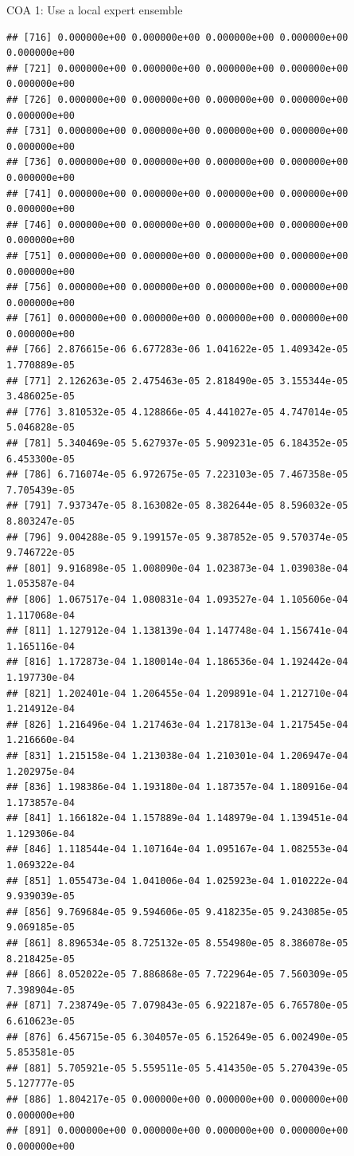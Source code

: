 \documentclass[ignorenonframetext,]{beamer}
\begin{document}
\begin{frame}[fragile]{COA 1: Use a local expert ensemble}
\begin{verbatim}
## [716] 0.000000e+00 0.000000e+00 0.000000e+00 0.000000e+00 0.000000e+00
## [721] 0.000000e+00 0.000000e+00 0.000000e+00 0.000000e+00 0.000000e+00
## [726] 0.000000e+00 0.000000e+00 0.000000e+00 0.000000e+00 0.000000e+00
## [731] 0.000000e+00 0.000000e+00 0.000000e+00 0.000000e+00 0.000000e+00
## [736] 0.000000e+00 0.000000e+00 0.000000e+00 0.000000e+00 0.000000e+00
## [741] 0.000000e+00 0.000000e+00 0.000000e+00 0.000000e+00 0.000000e+00
## [746] 0.000000e+00 0.000000e+00 0.000000e+00 0.000000e+00 0.000000e+00
## [751] 0.000000e+00 0.000000e+00 0.000000e+00 0.000000e+00 0.000000e+00
## [756] 0.000000e+00 0.000000e+00 0.000000e+00 0.000000e+00 0.000000e+00
## [761] 0.000000e+00 0.000000e+00 0.000000e+00 0.000000e+00 0.000000e+00
## [766] 2.876615e-06 6.677283e-06 1.041622e-05 1.409342e-05 1.770889e-05
## [771] 2.126263e-05 2.475463e-05 2.818490e-05 3.155344e-05 3.486025e-05
## [776] 3.810532e-05 4.128866e-05 4.441027e-05 4.747014e-05 5.046828e-05
## [781] 5.340469e-05 5.627937e-05 5.909231e-05 6.184352e-05 6.453300e-05
## [786] 6.716074e-05 6.972675e-05 7.223103e-05 7.467358e-05 7.705439e-05
## [791] 7.937347e-05 8.163082e-05 8.382644e-05 8.596032e-05 8.803247e-05
## [796] 9.004288e-05 9.199157e-05 9.387852e-05 9.570374e-05 9.746722e-05
## [801] 9.916898e-05 1.008090e-04 1.023873e-04 1.039038e-04 1.053587e-04
## [806] 1.067517e-04 1.080831e-04 1.093527e-04 1.105606e-04 1.117068e-04
## [811] 1.127912e-04 1.138139e-04 1.147748e-04 1.156741e-04 1.165116e-04
## [816] 1.172873e-04 1.180014e-04 1.186536e-04 1.192442e-04 1.197730e-04
## [821] 1.202401e-04 1.206455e-04 1.209891e-04 1.212710e-04 1.214912e-04
## [826] 1.216496e-04 1.217463e-04 1.217813e-04 1.217545e-04 1.216660e-04
## [831] 1.215158e-04 1.213038e-04 1.210301e-04 1.206947e-04 1.202975e-04
## [836] 1.198386e-04 1.193180e-04 1.187357e-04 1.180916e-04 1.173857e-04
## [841] 1.166182e-04 1.157889e-04 1.148979e-04 1.139451e-04 1.129306e-04
## [846] 1.118544e-04 1.107164e-04 1.095167e-04 1.082553e-04 1.069322e-04
## [851] 1.055473e-04 1.041006e-04 1.025923e-04 1.010222e-04 9.939039e-05
## [856] 9.769684e-05 9.594606e-05 9.418235e-05 9.243085e-05 9.069185e-05
## [861] 8.896534e-05 8.725132e-05 8.554980e-05 8.386078e-05 8.218425e-05
## [866] 8.052022e-05 7.886868e-05 7.722964e-05 7.560309e-05 7.398904e-05
## [871] 7.238749e-05 7.079843e-05 6.922187e-05 6.765780e-05 6.610623e-05
## [876] 6.456715e-05 6.304057e-05 6.152649e-05 6.002490e-05 5.853581e-05
## [881] 5.705921e-05 5.559511e-05 5.414350e-05 5.270439e-05 5.127777e-05
## [886] 1.804217e-05 0.000000e+00 0.000000e+00 0.000000e+00 0.000000e+00
## [891] 0.000000e+00 0.000000e+00 0.000000e+00 0.000000e+00 0.000000e+00

\end{verbatim}
\end{frame}
\end{document}
